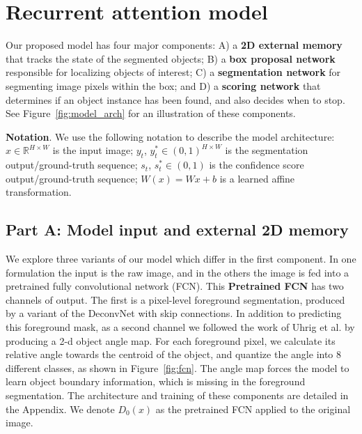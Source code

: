 \section{Recurrent attention model} 

Our proposed model has four major components: A) a \textbf{2D external memory}
that tracks the state of the segmented objects; B) a \textbf{box proposal network}
responsible for localizing objects of interest;  C) a \textbf{segmentation network} 
for segmenting image pixels within the box; and D) a \textbf{scoring network} 
that determines if an object instance has been found, and also decides when to stop.
See Figure~\ref{fig:model_arch} for an illustration of these components.



\textbf{Notation}. We use the following notation to describe the model
architecture: $x \in \mathbb{R}^{H \times W}$
is the input image; $y_{t}$, $y^*_{t} \in (0, 1)^{H \times W}$ is the
segmentation  output/ground-truth sequence; $s_{t}$, $s^*_{t} \in (0, 1)$ is
the confidence score output/ground-truth sequence; $W(x) = Wx + b$ is a learned
affine transformation.

\subsection{Part A: Model input and external 2D memory}

We explore three variants of our model which differ in the first component. In
one formulation the input is the raw image, and in the others the image is fed
into a pretrained fully convolutional network (FCN). This \textbf{Pretrained
FCN} has two channels of output.  The first is a pixel-level foreground
segmentation, produced by a variant of the DeconvNet \cite{noh15deconv} with
skip connections. In addition to predicting this foreground mask, as a second
channel we followed the work of Uhrig et al. \cite{uhrig16insseg}  by producing
a 2-d object angle map. For each foreground pixel, we calculate its relative
angle towards the centroid of the object, and quantize the angle into 8
different classes, as shown in Figure~\ref{fig:fcn}. The angle map forces the
model to learn object boundary information, which is missing in the foreground
segmentation.  The architecture and training of these components are detailed
in the Appendix. We denote $D_0(x)$ as the pretrained FCN applied to the
original image.

